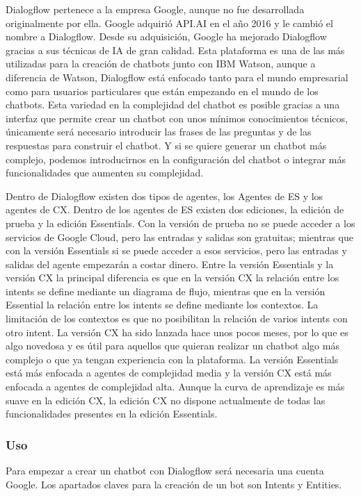 Dialogflow pertenece a la empresa Google, aunque no fue desarrollada originalmente por ella. Google adquirió API.AI en el año 2016 y le cambió el nombre a Dialogflow. Desde su adquisición, Google ha mejorado Dialogflow gracias a sus técnicas de \gls{IA} de gran calidad. Esta plataforma es una de las más utilizadas para la creación de chatbots junto con IBM Watson, aunque a diferencia de Watson, Dialogflow está enfocado tanto para el mundo empresarial como para usuarios particulares que están empezando en el mundo de los chatbots. Esta variedad en la complejidad del chatbot es posible gracias a una interfaz que permite crear un chatbot con unos mínimos conocimientos técnicos, únicamente será necesario introducir las frases de las preguntas y de las respuestas para construir el chatbot. Y si se quiere generar un chatbot más complejo, podemos introducirnos en la configuración del chatbot o integrar más funcionalidades que aumenten su complejidad.

Dentro de Dialogflow existen dos tipos de agentes, los Agentes de ES y los agentes de CX. Dentro de los agentes de ES existen dos ediciones, la edición de prueba y la edición Essentials. Con la versión de prueba no se puede acceder a los servicios de Google Cloud, pero las entradas y salidas son gratuitas; mientras que con la versión Essentials si se puede acceder a esos servicios, pero las entradas y salidas del agente empezarán a costar dinero. Entre la versión Essentials y la versión CX la principal diferencia es que en la versión CX la relación entre los intents se define mediante un diagrama de flujo, mientras que en la versión Essential la relación entre los intents se define mediante los contextos. La limitación de los contextos es que no posibilitan la relación de varios intents con otro intent. La versión CX ha sido lanzada hace unos pocos meses, por lo que es algo novedosa y es útil para aquellos que quieran realizar un chatbot algo más complejo o que ya tengan experiencia con la plataforma. La versión Essentials está más enfocada a agentes de complejidad media y la versión CX está más enfocada a agentes de complejidad alta. Aunque la curva de aprendizaje es más suave en la edición CX, la edición CX no dispone actualmente de todas las funcionalidades presentes en la edición Essentials.

\subsubsection*{Uso}

Para empezar a crear un chatbot con Dialogflow será necesaria una cuenta Google. Los apartados claves para la creación de un bot son Intents y Entities.

